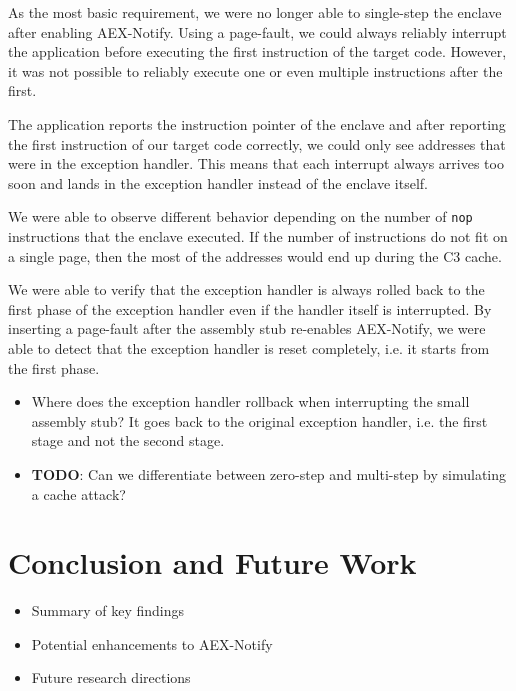 \documentclass{llncs}
\begin{document}
As the most basic requirement,
we were no longer able to single-step the enclave after enabling AEX-Notify.
Using a page-fault, we could always reliably interrupt the application
before executing the first instruction of the target code.
However, it was not possible to reliably execute one or even multiple instructions after the first.

The application reports the instruction pointer of the enclave
and after reporting the first instruction of our target code correctly,
we could only see addresses that were in the exception handler.
This means that each interrupt always arrives too soon and
lands in the exception handler instead of the enclave itself.

We were able to observe different behavior depending on the number of
\texttt{nop} instructions that the enclave executed.
If the number of instructions do not fit on a single page,
then the most of the addresses would end up during the C3 cache.

We were able to verify that the exception handler is always rolled back to the first phase of the exception handler
even if the handler itself is interrupted.
By inserting a page-fault after the assembly stub re-enables AEX-Notify,
we were able to detect that the exception handler is reset completely,
i.e. it starts from the first phase.

\begin{itemize}
  \item Where does the exception handler rollback when interrupting the small assembly stub?
    It goes back to the original exception handler, i.e. the first stage and not the second stage.
  \item \textbf{TODO}: Can we differentiate between zero-step and multi-step by simulating a cache attack?
\end{itemize}

\section{Conclusion and Future Work}

\begin{itemize}
    \item Summary of key findings
    \item Potential enhancements to AEX-Notify
    \item Future research directions
\end{itemize}


%

\end{document}
